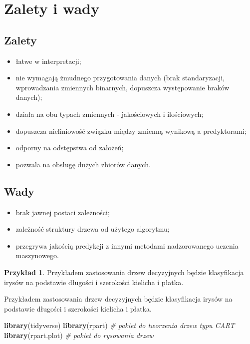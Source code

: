 \documentclass[
]{book}
\newenvironment{Shaded}{\begin{snugshade}}{\end{snugshade}}
\newcommand{\CommentTok}[1]{\textcolor[rgb]{0.56,0.35,0.01}{\textit{#1}}}
\newcommand{\FunctionTok}[1]{\textcolor[rgb]{0.13,0.29,0.53}{\textbf{#1}}}
\newcommand{\NormalTok}[1]{#1}
\providecommand{\tightlist}{%
  \setlength{\itemsep}{0pt}\setlength{\parskip}{0pt}}
\theoremstyle{plain}
\theoremstyle{definition}
\theoremstyle{definition}
\theoremstyle{definition}
\newtheorem{example}{Przykład}[chapter]
\theoremstyle{definition}
\theoremstyle{definition}
\theoremstyle{remark}
\begin{document}
\section{Zalety i wady}\label{zalety-i-wady}

\subsection{Zalety}\label{zalety}

\begin{itemize}
\tightlist
\item
  łatwe w interpretacji;
\item
  nie wymagają żmudnego przygotowania danych (brak standaryzacji, wprowadzania zmiennych binarnych, dopuszcza występowanie braków danych);
\item
  działa na obu typach zmiennych - jakościowych i ilościowych;
\item
  dopuszcza nieliniowość związku między zmienną wynikową a predyktorami;
\item
  odporny na odstępstwa od założeń;
\item
  pozwala na obsługę dużych zbiorów danych.
\end{itemize}

\subsection{Wady}\label{wady}

\begin{itemize}
\tightlist
\item
  brak jawnej postaci zależności;
\item
  zależność struktury drzewa od użytego algorytmu;
\item
  przegrywa jakością predykcji z innymi metodami nadzorowanego uczenia maszynowego.
\end{itemize}

\begin{example}
\protect\hypertarget{exm:przyk41}{}\label{exm:przyk41}Przykładem zastosowania drzew decyzyjnych będzie klasyfikacja irysów na podstawie długości i szerokości kielicha i płatka.
\end{example}

Przykładem zastosowania drzew decyzyjnych będzie klasyfikacja irysów na podstawie długości i szerokości kielicha i płatka.

\begin{Shaded}
\begin{Highlighting}[]
\FunctionTok{library}\NormalTok{(tidyverse) }
\FunctionTok{library}\NormalTok{(rpart) }\CommentTok{\# pakiet do tworzenia drzew typu CART}
\FunctionTok{library}\NormalTok{(rpart.plot) }\CommentTok{\# pakiet do rysowania drzew}
\end{Highlighting}
\end{Shaded}
\end{document}
